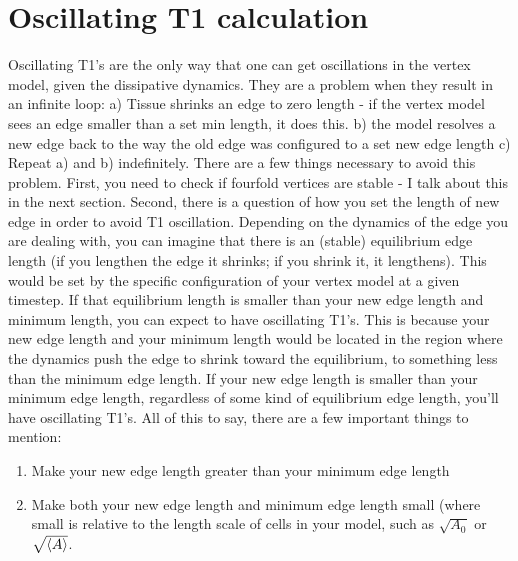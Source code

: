 \documentclass[12pt,a4paper]{article}
\begin{document}
\section{Oscillating T1 calculation}
Oscillating T1's are the only way that one can get oscillations in the vertex model, given the dissipative dynamics. They are a problem when they result in an infinite loop: a) Tissue shrinks an edge to zero length - if the vertex model sees an edge smaller than a set min length, it does this. b) the model resolves a new edge back to the way the old edge was configured to a set new edge length c) Repeat a) and b) indefinitely. There are a few things necessary to avoid this problem. First, you need to check if fourfold vertices are stable - I talk about this in the next section. Second, there is a question of how you set the length of new edge in order to avoid T1 oscillation. Depending on the dynamics of the edge you are dealing with, you can imagine that there is an (stable) equilibrium edge length (if you lengthen the edge it shrinks; if you shrink it, it lengthens). This would be set by the specific configuration of your vertex model at a given timestep. If that equilibrium length is smaller than your new edge length and minimum length, you can expect to have oscillating T1's. This is because your new edge length and your minimum length would be located in the region where the dynamics push the edge to shrink toward the equilibrium, to something less than the minimum edge length. If your new edge length is smaller than your minimum edge length, regardless of some kind of equilibrium edge length, you'll have oscillating T1's. All of this to say, there are a few important things to mention:

\begin{enumerate}
	\item Make your new edge length greater than your minimum edge length
	\item Make both your new edge length and minimum edge length small (where small is relative to the length scale of cells in your model, such as $\sqrt{A_0}$ or $\sqrt{\expval{A}}$.
\end{enumerate} 
\end{document}
